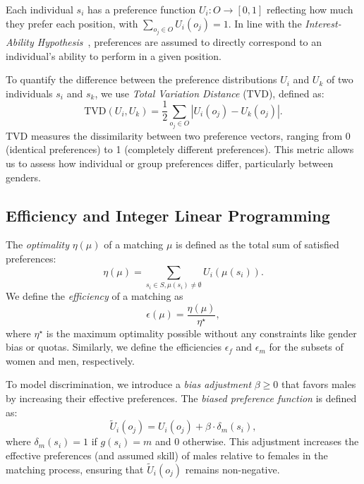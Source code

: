 \documentclass[letterpaper]{article}
\begin{document}
Each individual \( s_i \) has a preference function \( U_i : O \to [0, 1] \) reflecting how much they prefer each position, with \( \sum_{o_j \in O} U_i(o_j) = 1 \). In line with the \textit{Interest-Ability Hypothesis}~\cite{jintelligence10030043}, preferences are assumed to directly correspond to an individual's ability to perform in a given position.

To quantify the difference between the preference distributions \( U_i \) and \( U_k \) of two individuals \( s_i \) and \( s_k \), we use \textit{Total Variation Distance} (TVD), defined as:
\[
\text{TVD}(U_i, U_k) = \frac{1}{2} \sum_{o_j \in O} \left| U_i(o_j) - U_k(o_j) \right|.
\]
TVD measures the dissimilarity between two preference vectors, ranging from 0 (identical preferences) to 1 (completely different preferences). This metric allows us to assess how individual or group preferences differ, particularly between genders.

\subsection*{Efficiency and Integer Linear Programming}

The \textit{optimality} \( \eta(\mu) \) of a matching \( \mu \) is defined as the total sum of satisfied preferences:
\[
\eta(\mu) = \sum_{s_i \in S, \mu(s_i) \neq \emptyset} U_i(\mu(s_i)).
\]
We define the \textit{efficiency} of a matching as
\[
\epsilon(\mu)=\frac{\eta(\mu)}{\eta^{\star}},
\]
where \(\eta^{\star}\) is the maximum optimality possible without any constraints like gender bias or quotas. Similarly, we define the efficiencies \( \epsilon_f \) and \( \epsilon_m\) for the subsets of women and men, respectively.

To model discrimination, we introduce a \textit{bias adjustment} \( \beta \geq 0 \) that favors males by increasing their effective preferences. The \textit{biased preference function} is defined as:
\[
\tilde{U}_i(o_j) = U_i(o_j) + \beta \cdot \delta_m(s_i),
\]
where \( \delta_m(s_i) = 1 \) if \( g(s_i) = m \) and \( 0 \) otherwise. This adjustment increases the effective preferences (and assumed skill) of males relative to females in the matching process, ensuring that \( \tilde{U}_i(o_j) \) remains non-negative.
\end{document}
